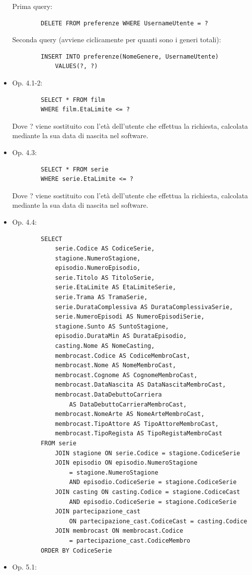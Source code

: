 \documentclass[a4paper,12pt]{report}
\begin{document}
\begin{itemize}
	Prima query:
	\begin{verbatim}
		DELETE FROM preferenze WHERE UsernameUtente = ?
	\end{verbatim}
	Seconda query (avviene ciclicamente per quanti sono i generi totali):
	\begin{verbatim}
		INSERT INTO preferenze(NomeGenere, UsernameUtente)
			VALUES(?, ?)
	\end{verbatim}
	\item Op. 4.1-2:
	\begin{verbatim}
		SELECT * FROM film
		WHERE film.EtaLimite <= ?
	\end{verbatim}
	Dove ? viene sostituito con l'età dell'utente che effettua la richiesta, calcolata mediante la sua data di nascita nel software.
	\item Op. 4.3:
	\begin{verbatim}
		SELECT * FROM serie
		WHERE serie.EtaLimite <= ?
	\end{verbatim}
	Dove ? viene sostituito con l'età dell'utente che effettua la richiesta, calcolata mediante la sua data di nascita nel software.
	\item Op. 4.4:
	\begin{verbatim}
		SELECT 
			serie.Codice AS CodiceSerie,
			stagione.NumeroStagione,
			episodio.NumeroEpisodio,
			serie.Titolo AS TitoloSerie,
			serie.EtaLimite AS EtaLimiteSerie,
			serie.Trama AS TramaSerie,
			serie.DurataComplessiva AS DurataComplessivaSerie,
			serie.NumeroEpisodi AS NumeroEpisodiSerie,
			stagione.Sunto AS SuntoStagione,
			episodio.DurataMin AS DurataEpisodio,
			casting.Nome AS NomeCasting,
			membrocast.Codice AS CodiceMembroCast,
			membrocast.Nome AS NomeMembroCast,
			membrocast.Cognome AS CognomeMembroCast,
			membrocast.DataNascita AS DataNascitaMembroCast,
			membrocast.DataDebuttoCarriera 
				AS DataDebuttoCarrieraMembroCast,
			membrocast.NomeArte AS NomeArteMembroCast,
			membrocast.TipoAttore AS TipoAttoreMembroCast,
			membrocast.TipoRegista AS TipoRegistaMembroCast
		FROM serie
			JOIN stagione ON serie.Codice = stagione.CodiceSerie
			JOIN episodio ON episodio.NumeroStagione 
				= stagione.NumeroStagione
				AND episodio.CodiceSerie = stagione.CodiceSerie
			JOIN casting ON casting.Codice = stagione.CodiceCast
				AND episodio.CodiceSerie = stagione.CodiceSerie 
			JOIN partecipazione_cast 
				ON partecipazione_cast.CodiceCast = casting.Codice
			JOIN membrocast ON membrocast.Codice 
				= partecipazione_cast.CodiceMembro
		ORDER BY CodiceSerie
	\end{verbatim}
	\item Op. 5.1:\\

\end{itemize}
\end{document}
